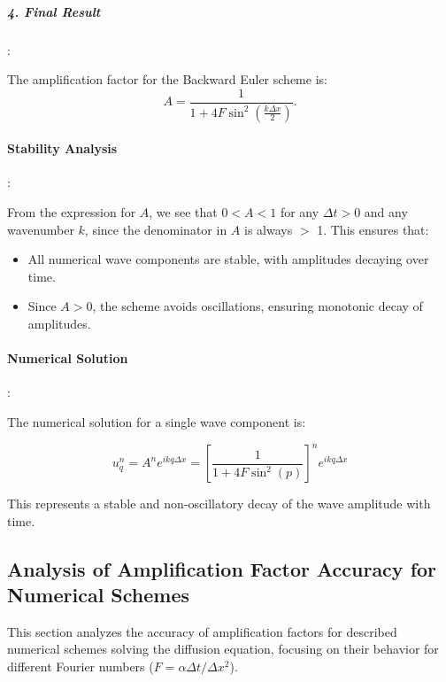 \documentclass{article}
\begin{document}
			\subparagraph{4. Final Result}:
			
			The amplification factor for the Backward Euler scheme is:
			\[
			A = \frac{1}{1 + 4F \sin^2\left(\frac{k \Delta x}{2}\right)}.
			\]
			
			\paragraph{Stability Analysis}:
			
			From the expression for \( A \), we see that \( 0 < A < 1 \) for any \( \Delta t > 0 \) and any wavenumber \( k \), since the denominator in \( A \) is always \(>\) 1. This ensures that:
			\begin{itemize}
				\item All numerical wave components are stable, with amplitudes decaying over time.
				\item Since \( A > 0 \), the scheme avoids oscillations, ensuring monotonic decay of amplitudes.
			\end{itemize}
			
			\paragraph{Numerical Solution}:
			
			The numerical solution for a single wave component is:
			
			\[
			u_q^n = A^n e^{i k q \Delta x} = \left[\frac{1}{1 + 4 F \sin^2(p)}\right]^n e^{i k q \Delta x}
			\]
			
			This represents a stable and non-oscillatory decay of the wave amplitude with time.
		
		\subsection{Analysis of Amplification Factor Accuracy for Numerical Schemes}
		
			This section analyzes the accuracy of amplification factors for described numerical schemes solving the diffusion equation, focusing on their behavior for different Fourier numbers (\( F = \alpha \Delta t / \Delta x^2 \)).
			
\end{document}
